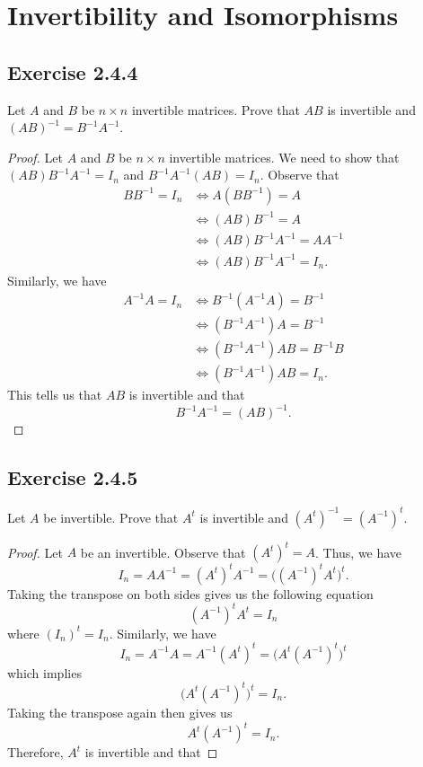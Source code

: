 \section{Invertibility and Isomorphisms}

\subsection*{Exercise 2.4.4}\label{Exercise 2.4.4} Let \( A  \) and \( B  \) be \( n \times n  \) invertible matrices. Prove that \( AB  \) is invertible and \( (AB)^{-1} = B^{-1} A^{-1} \).
\begin{proof}
Let \( A  \) and \( B  \) be \( n \times n  \) invertible matrices. We need to show that \( (AB)B^{-1}A^{-1} = {I}_{n} \) and \( B^{-1} A^{-1} (AB) = {I}_{n} \). Observe that
\begin{align*}
    B B^{-1} = {I}_{n}   &\iff A(B B^{-1}) = A   \\
                         &\iff  (AB) B^{-1} = A  \\
                         &\iff (AB) B^{-1}A^{-1} = A A^{-1} \\ 
                         &\iff (AB) B^{-1} A^{-1} = {I}_{n}.
\end{align*}
Similarly, we have 
\begin{align*}
     A^{-1} A  = {I}_{n} &\iff B^{-1}(A^{-1} A ) = B^{-1}  \\
                         &\iff (B^{-1} A^{-1}) A = B^{-1} \\ 
                         &\iff (B^{-1} A^{-1}) AB = B^{-1}B \\
                         &\iff (B^{-1}A^{-1}) AB = {I}_{n}.
\end{align*}
This tells us that \( AB  \) is invertible and that  
\[  B^{-1}A^{-1} = (AB)^{-1}. \]
\end{proof}

\subsection*{Exercise 2.4.5} Let \( A  \) be invertible. Prove that \( A^{t}  \) is invertible and \( (A^{t})^{-1} = (A^{-1})^{t} \).
\begin{proof}
Let \( A   \) be an invertible. Observe that \( (A^{t})^{t} = A  \). Thus, we have
\[  {I}_{n} = A A^{-1} = (A^{t})^{t} A^{-1} = \Big( (A^{-1})^{t} A^{t} \Big)^{t}. \]
Taking the transpose on both sides gives us the following equation
\[  (A^{-1})^{t} A^{t} = {I}_{n} \] where \( ({I}_{n})^{t} = {I}_{n} \).
Similarly, we have
\[  {I}_{n} =  A^{-1} A = A^{-1} (A^{t})^{t} = \Big( A^{t} (A^{-1})^{t} \Big)^{t}  \]
which implies
\[ \Big( A^{t} (A^{-1})^{t} \Big)^{t} = {I}_{n}.  \]
Taking the transpose again then gives us
\[  A^{t} (A^{-1})^{t} = {I}_{n}. \]
Therefore, \( A^{t} \) is invertible and that 
\end{proof}

